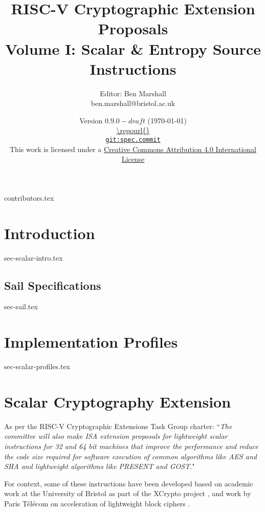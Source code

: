 \documentclass[11pt]{article}
\title{RISC-V Cryptographic Extension Proposals\\Volume I: Scalar \& Entropy Source Instructions}
\author{Editor: Ben Marshall\\ben.marshall@bristol.ac.uk}
\date{Version $0.9.0-draft$ (\today) \\
\medskip
\url{\repourl{}} \\
\href{\repourl{}}{
{\small \tt git:{spec.commit}}} \\
\bigskip
{\small
This work is licensed under a
\href{http://creativecommons.org/licenses/by/4.0/}{Creative Commons Attribution 4.0 International License}
}
}
\begin{document}

\maketitle

{contributors.tex}

\tableofcontents




\newpage
\section{Introduction}
\label{sec:intro}
{sec-scalar-intro.tex}

\subsection{Sail Specifications}
\label{sec:sail}
{sec-sail.tex}

\newpage
\section{Implementation Profiles}
\label{sec:profiles}
{sec-scalar-profiles.tex}

\clearpage
\section{Scalar Cryptography Extension}
\label{sec:scalar}

As per the RISC-V Cryptographic Extensions Task Group charter:
``{\em The committee will also make ISA extension proposals for lightweight
scalar instructions for 32 and 64 bit machines that improve the performance
and reduce the code size required for software execution of common algorithms
like AES and SHA and lightweight algorithms like PRESENT and GOST}."

\bigskip

For context, some of these instructions have been developed based on academic
work at the University of Bristol as part of the XCrypto project
\cite{MPP:19},
and work by
Paris T\'{e}l\'{e}com on acceleration of lightweight block ciphers
\cite{TGMGD:19}.


\end{document}
